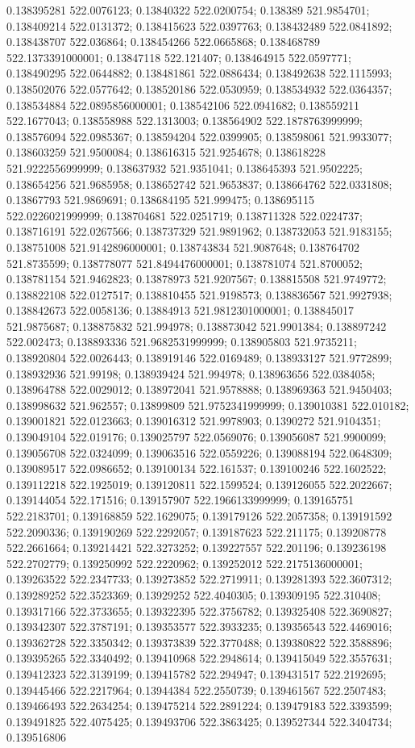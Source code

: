 0.138395281 522.0076123; 0.13840322 522.0200754; 0.138389 521.9854701; 0.138409214 522.0131372; 0.138415623 522.0397763; 0.138432489 522.0841892; 0.138438707 522.036864; 0.138454266 522.0665868; 0.138468789 522.1373391000001; 0.13847118 522.121407; 0.138464915 522.0597771; 0.138490295 522.0644882; 0.138481861 522.0886434; 0.138492638 522.1115993; 0.138502076 522.0577642; 0.138520186 522.0530959; 0.138534932 522.0364357; 0.138534884 522.0895856000001; 0.138542106 522.0941682; 0.138559211 522.1677043; 0.138558988 522.1313003; 0.138564902 522.1878763999999; 0.138576094 522.0985367; 0.138594204 522.0399905; 0.138598061 521.9933077; 0.138603259 521.9500084; 0.138616315 521.9254678; 0.138618228 521.9222556999999; 0.138637932 521.9351041; 0.138645393 521.9502225; 0.138654256 521.9685958; 0.138652742 521.9653837; 0.138664762 522.0331808; 0.13867793 521.9869691; 0.138684195 521.999475; 0.138695115 522.0226021999999; 0.138704681 522.0251719; 0.138711328 522.0224737; 0.138716191 522.0267566; 0.138737329 521.9891962; 0.138732053 521.9183155; 0.138751008 521.9142896000001; 0.138743834 521.9087648; 0.138764702 521.8735599; 0.138778077 521.8494476000001; 0.138781074 521.8700052; 0.138781154 521.9462823; 0.13878973 521.9207567; 0.138815508 521.9749772; 0.138822108 522.0127517; 0.138810455 521.9198573; 0.138836567 521.9927938; 0.138842673 522.0058136; 0.13884913 521.9812301000001; 0.138845017 521.9875687; 0.138875832 521.994978; 0.138873042 521.9901384; 0.138897242 522.002473; 0.138893336 521.9682531999999; 0.138905803 521.9735211; 0.138920804 522.0026443; 0.138919146 522.0169489; 0.138933127 521.9772899; 0.138932936 521.99198; 0.138939424 521.994978; 0.138963656 522.0384058; 0.138964788 522.0029012; 0.138972041 521.9578888; 0.138969363 521.9450403; 0.138998632 521.962557; 0.13899809 521.9752341999999; 0.139010381 522.010182; 0.139001821 522.0123663; 0.139016312 521.9978903; 0.1390272 521.9104351; 0.139049104 522.019176; 0.139025797 522.0569076; 0.139056087 521.9900099; 0.139056708 522.0324099; 0.139063516 522.0559226; 0.139088194 522.0648309; 0.139089517 522.0986652; 0.139100134 522.161537; 0.139100246 522.1602522; 0.139112218 522.1925019; 0.139120811 522.1599524; 0.139126055 522.2022667; 0.139144054 522.171516; 0.139157907 522.1966133999999; 0.139165751 522.2183701; 0.139168859 522.1629075; 0.139179126 522.2057358; 0.139191592 522.2090336; 0.139190269 522.2292057; 0.139187623 522.211175; 0.139208778 522.2661664; 0.139214421 522.3273252; 0.139227557 522.201196; 0.139236198 522.2702779; 0.139250992 522.2220962; 0.139252012 522.2175136000001; 0.139263522 522.2347733; 0.139273852 522.2719911; 0.139281393 522.3607312; 0.139289252 522.3523369; 0.13929252 522.4040305; 0.139309195 522.310408; 0.139317166 522.3733655; 0.139322395 522.3756782; 0.139325408 522.3690827; 0.139342307 522.3787191; 0.139353577 522.3933235; 0.139356543 522.4469016; 0.139362728 522.3350342; 0.139373839 522.3770488; 0.139380822 522.3588896; 0.139395265 522.3340492; 0.139410968 522.2948614; 0.139415049 522.3557631; 0.139412323 522.3139199; 0.139415782 522.294947; 0.139431517 522.2192695; 0.139445466 522.2217964; 0.13944384 522.2550739; 0.139461567 522.2507483; 0.139466493 522.2634254; 0.139475214 522.2891224; 0.139479183 522.3393599; 0.139491825 522.4075425; 0.139493706 522.3863425; 0.139527344 522.3404734; 0.139516806 